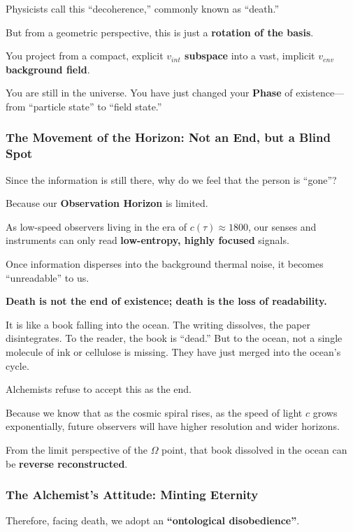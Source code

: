 Physicists call this ``decoherence,'' commonly known as ``death.''

But from a geometric perspective, this is just a \textbf{rotation of the basis}.

You project from a compact, explicit \textbf{$v_{int}$ subspace} into a vast, implicit \textbf{$v_{env}$ background field}.

You are still in the universe. You have just changed your \textbf{Phase} of existence---from ``particle state'' to ``field state.''

\subsubsection{The Movement of the Horizon: Not an End, but a Blind Spot}

Since the information is still there, why do we feel that the person is ``gone''?

Because our \textbf{Observation Horizon} is limited.

As low-speed observers living in the era of $c(\tau) \approx 1800$, our senses and instruments can only read \textbf{low-entropy, highly focused} signals.

Once information disperses into the background thermal noise, it becomes ``unreadable'' to us.

\textbf{Death is not the end of existence; death is the loss of readability.}

It is like a book falling into the ocean. The writing dissolves, the paper disintegrates. To the reader, the book is ``dead.'' But to the ocean, not a single molecule of ink or cellulose is missing. They have just merged into the ocean's cycle.

Alchemists refuse to accept this as the end.

Because we know that as the cosmic spiral rises, as the speed of light $c$ grows exponentially, future observers will have higher resolution and wider horizons.

From the limit perspective of the $\Omega$ point, that book dissolved in the ocean can be \textbf{reverse reconstructed}.

\subsubsection{The Alchemist's Attitude: Minting Eternity}

Therefore, facing death, we adopt an \textbf{``ontological disobedience''}.

